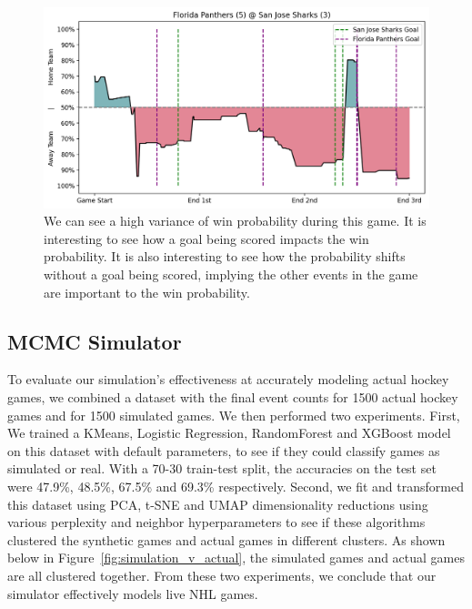 \documentclass[11pt]{article}
\begin{document}
\begin{figure}
    \centering
    \includegraphics[width=\textwidth]{images/good_xgb_example.png}
    \caption{We can see a high variance of win probability during this game. It is interesting to
    see how a goal being scored impacts the win probability. It is also interesting to see how
    the probability shifts without a goal being scored, implying the other events in the game
    are important to the win probability.}
    \label{fig:xgboost_res}
\end{figure}

\subsection{MCMC Simulator}

To evaluate our simulation's effectiveness at accurately modeling actual hockey 
games, we combined a dataset with the final event counts for 1500 actual hockey 
games and for 1500 simulated games. We then performed two experiments. First, We 
trained a KMeans, Logistic Regression, RandomForest and XGBoost model on this 
dataset with default parameters, to see 
if they could classify games as simulated or real. With a 70-30 train-test split, 
the accuracies on the test set were 47.9\%, 48.5\%, 67.5\% and 69.3\% respectively. 
Second, we fit and transformed this dataset using PCA, t-SNE and UMAP 
dimensionality reductions using various perplexity and neighbor hyperparameters to see 
if these algorithms clustered the synthetic games and actual games in 
different clusters. As shown below in Figure~\ref{fig:simulation_v_actual}, the simulated
games and actual games are all clustered together. From these two experiments, we conclude
that our simulator effectively models live NHL games.
\end{document}
